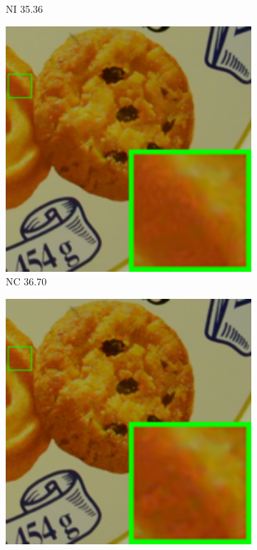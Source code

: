 \begin{figure}
\begin{subfigure}[t]{0.19\textwidth}
\caption{NI 35.36}
    \end{subfigure}
\hfill
    \begin{subfigure}[t]{0.19\textwidth}
        \centering
        \includegraphics[width=1\textwidth]{images/twsc/cc/resize_br_NC_d600_iso3200_2_real.png}
		\caption{NC 36.70}
    \end{subfigure}
    \hfill
    \begin{subfigure}[t]{0.19\textwidth}
        \centering
        \includegraphics[width=1\textwidth]{images/twsc/cc/resize_br_CCNoise_d600_iso3200_2.png}

\end{subfigure}
\end{figure}

